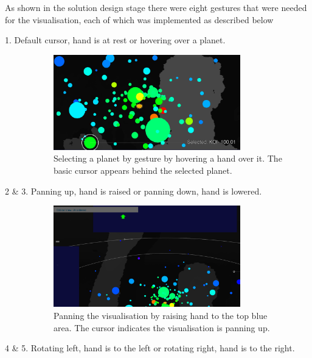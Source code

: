 As
shown in the solution design stage there were eight gestures that were needed
for the visualisation, each of which was implemented as described below
\begin{description}
 \item[1. Default cursor, hand is at rest or hovering over a planet.]
 
\begin{figure}[H]
  \centering
      \includegraphics[width=0.8\textwidth]{images/select.PNG}
  \caption[Selecting a planet by gesture]{Selecting a planet by gesture by
hovering a hand over it. The basic cursor appears behind the selected planet.}
  \label{fig:left}
\end{figure}

 \item[2 \& 3. Panning up, hand is raised or panning down, hand is lowered.]
 \begin{figure}[H]
  \centering
      \includegraphics[width=0.8\textwidth]{images/up.PNG}
  \caption[Panning the visualisation by raising hand]{Panning the visualisation
by raising hand to the top blue area. The cursor indicates the visualisation is
panning up.}
  \label{fig:up}
\end{figure}
 
 \item[4 \& 5. Rotating left, hand is to the left or rotating right, hand is to
the right.]
 

\end{description}
